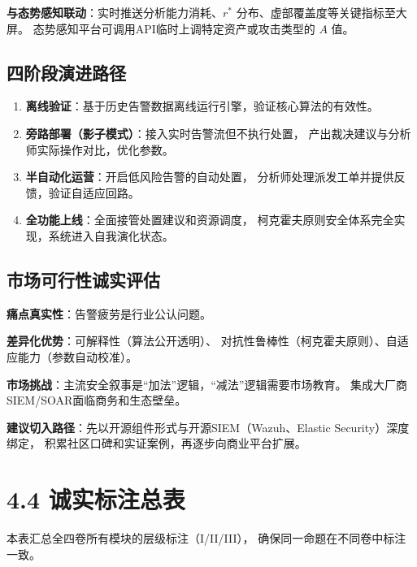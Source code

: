 \documentclass[11pt,a4paper]{article}
\begin{document}
\textbf{与态势感知联动}：实时推送分析能力消耗、$r^*$ 分布、虚部覆盖度等关键指标至大屏。
态势感知平台可调用API临时上调特定资产或攻击类型的 $A$ 值。

\subsection{四阶段演进路径}

\begin{enumerate}
    \item \textbf{离线验证}：基于历史告警数据离线运行引擎，验证核心算法的有效性。
    \item \textbf{旁路部署（影子模式）}：接入实时告警流但不执行处置，
          产出裁决建议与分析师实际操作对比，优化参数。
    \item \textbf{半自动化运营}：开启低风险告警的自动处置，
          分析师处理派发工单并提供反馈，验证自适应回路。
    \item \textbf{全功能上线}：全面接管处置建议和资源调度，
          柯克霍夫原则安全体系完全实现，系统进入自我演化状态。
\end{enumerate}

\subsection{市场可行性诚实评估}

\textbf{痛点真实性}：告警疲劳是行业公认问题。

\textbf{差异化优势}：可解释性（算法公开透明）、
对抗性鲁棒性（柯克霍夫原则）、自适应能力（参数自动校准）。

\textbf{市场挑战}：主流安全叙事是“加法”逻辑，“减法”逻辑需要市场教育。
集成大厂商SIEM/SOAR面临商务和生态壁垒。

\textbf{建议切入路径}：先以开源组件形式与开源SIEM（Wazuh、Elastic Security）深度绑定，
积累社区口碑和实证案例，再逐步向商业平台扩展。

\section{4.4 诚实标注总表}

本表汇总全四卷所有模块的层级标注（I/II/III），
确保同一命题在不同卷中标注一致。
\end{document}
